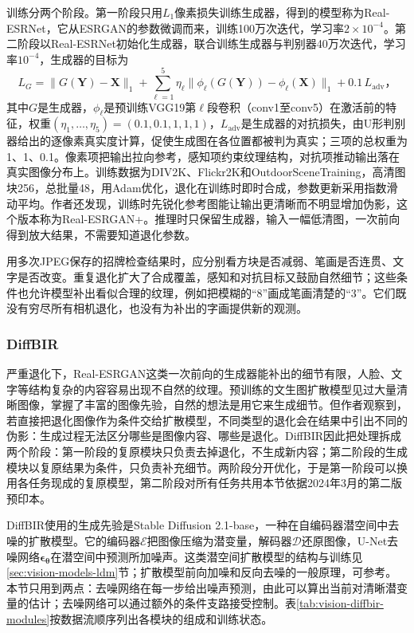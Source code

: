 训练分两个阶段。第一阶段只用$L_1$像素损失训练生成器，得到的模型称为Real-ESRNet，它从ESRGAN的参数微调而来，训练100万次迭代，学习率$2\times10^{-4}$。第二阶段以Real-ESRNet初始化生成器，联合训练生成器与判别器40万次迭代，学习率$10^{-4}$，生成器的目标为
\begin{equation}
 L_G=\bigl\lVert G(\bm{Y})-\bm{X}\bigr\rVert_1
 +\sum_{\ell=1}^{5}\eta_\ell
  \bigl\lVert\phi_\ell(G(\bm{Y}))-\phi_\ell(\bm{X})\bigr\rVert_1
 +0.1\,L_{\mathrm{adv}}\text{，}
 \label{eq:vision-real-esrgan-loss}
\end{equation}
其中$G$是生成器，$\phi_\ell$是预训练VGG19第$\ell$段卷积（conv1至conv5）在激活前的特征，权重$(\eta_1,\dots,\eta_5)=(0.1,0.1,1,1,1)$，$L_{\mathrm{adv}}$是生成器的对抗损失，由U形判别器给出的逐像素真实度计算，促使生成图在各位置都被判为真实；三项的总权重为1、1、0.1。像素项把输出拉向参考，感知项约束纹理结构，对抗项推动输出落在真实图像分布上。训练数据为DIV2K、Flickr2K和OutdoorSceneTraining，高清图块256，总批量48，用Adam优化，退化在训练时即时合成，参数更新采用指数滑动平均。作者还发现，训练时先锐化参考图能让输出更清晰而不明显增加伪影，这个版本称为Real-ESRGAN+。推理时只保留生成器，输入一幅低清图，一次前向得到放大结果，不需要知道退化参数。

用多次JPEG保存的招牌检查结果时，应分别看方块是否减弱、笔画是否连贯、文字是否改变。重复退化扩大了合成覆盖，感知和对抗目标又鼓励自然细节；这些条件也允许模型补出看似合理的纹理，例如把模糊的“8”画成笔画清楚的“3”。它们既没有穷尽所有相机退化，也没有为补出的字画提供新的观测。

\subsubsection{DiffBIR}
\label{sec:vision-restoration-diffbir}

严重退化下，Real-ESRGAN这类一次前向的生成器能补出的细节有限，人脸、文字等结构复杂的内容容易出现不自然的纹理。预训练的文生图扩散模型见过大量清晰图像，掌握了丰富的图像先验，自然的想法是用它来生成细节。但作者观察到，若直接把退化图像作为条件交给扩散模型，不同类型的退化会在结果中引出不同的伪影：生成过程无法区分哪些是图像内容、哪些是退化。DiffBIR因此把处理拆成两个阶段：第一阶段的复原模块只负责去掉退化，不生成新内容；第二阶段的生成模块以复原结果为条件，只负责补充细节。两阶段分开优化，于是第一阶段可以换用各任务现成的复原模型，第二阶段对所有任务共用本节依据2024年3月的第二版预印本。

DiffBIR使用的生成先验是Stable Diffusion 2.1-base，一种在自编码器潜空间中去噪的扩散模型。它的编码器$\mathcal{E}$把图像压缩为潜变量，解码器$\mathcal{D}$还原图像，U-Net去噪网络$\bm{\epsilon}_{\bm{\theta}}$在潜空间中预测所加噪声。这类潜空间扩散模型的结构与训练见\ref{sec:vision-models-ldm}节；扩散模型前向加噪和反向去噪的一般原理，可参考。本节只用到两点：去噪网络在每一步给出噪声预测，由此可以算出当前对清晰潜变量的估计；去噪网络可以通过额外的条件支路接受控制。表\ref{tab:vision-diffbir-modules}按数据流顺序列出各模块的组成和训练状态。

